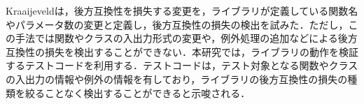 \documentclass[submit]{ipsj}
\begin{document}
Kraaijeveldは，後方互換性を損失する変更を，ライブラリが定義している関数名やパラメータ数の変更と定義し，後方互換性の損失の検出を試みた\cite{detecting-breaking-changes-in-js-apis}．ただし，この手法では関数やクラスの入出力形式の変更や，例外処理の追加などによる後方互換性の損失を検出することができない．本研究では，ライブラリの動作を検証するテストコードを利用する．テストコードは，テスト対象となる関数やクラスの入出力の情報や例外の情報を有しており，ライブラリの後方互換性の損失の種類を絞ることなく検出することができると示唆される．



%
%
\end{document}
